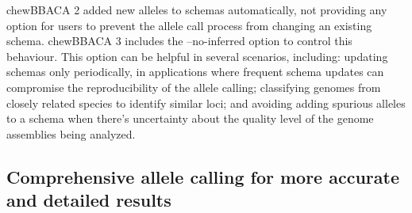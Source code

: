 chewBBACA 2 added new alleles to schemas automatically, not providing any option for users to prevent the allele call process from changing an existing schema. chewBBACA 3 includes the --no-inferred option to control this behaviour. This option can be helpful in several scenarios, including: updating schemas only periodically, in applications where frequent schema updates can compromise the reproducibility of the allele calling; classifying genomes from closely related species to identify similar loci; and avoiding adding spurious alleles to a schema when there's uncertainty about the quality level of the genome assemblies being analyzed.

\subsection{Comprehensive allele calling for more accurate and detailed results} \label{ssec:results_discussion_ssec3}

